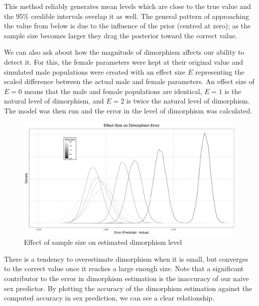 \documentclass[letterpaper]{article}
\begin{document}
This method reliably generates mean levels which are close to the true value and the 95\% credible intervals overlap it as well. The general pattern of approaching the value from below is due to the influence of the prior (centred at zero); as the sample size becomes larger they drag the posterior toward the correct value.

We can also ask about how the magnitude of dimorphism affects our ability to detect it. For this, the female parameters were kept at their original value and simulated male populations were created with an effect size $E$ representing the scaled difference between the actual male and female parameters. An effect size of $E = 0$ means that the male and female populations are identical, $E = 1$ is the natural level of dimorphism, and $E = 2$ is twice the natural level of dimorphism. The model was then run and the error in the level of dimorphism was calculated.

\begin{figure}[H]
	\centering
	\includegraphics[width = \textwidth]{images/alligatorEffectSize.png}
	\caption{Effect of sample size on estimated dimorphism level}
	\label{fig:alligatorEffectSizes}
\end{figure}

There is a tendency to overestimate dimorphism when it is small, but converges to the correct value once it reaches a large enough size. Note that a significant contributor to the error in dimorphism estimation is the inaccuracy of our naive sex predictor. By plotting the accuracy of the dimorphism estimation against the computed accuracy in sex prediction, we can see a clear relationship.
\end{document}
